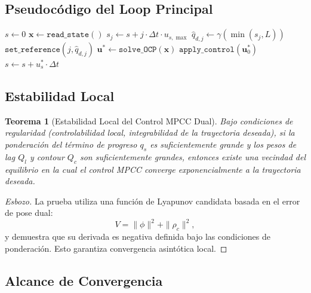 \documentclass[11pt,a4paper]{article}
\newtheorem{theorem}{Teorema}[section]
\begin{document}
\subsection{Pseudocódigo del Loop Principal}

\begin{algorithm}[H]
\caption{MPCC Loop Principal}
\begin{algorithmic}[1]
\State $s \gets 0$ 
    \State $\mathbf{x} \gets \texttt{read\_state}()$
        \State $s_j \gets s + j \cdot \Delta t \cdot u_{s,\max}$
        \State $\hat{q}_{d,j} \gets \gamma(\min(s_j, L))$ 
        \State $\texttt{set\_reference}(j, \hat{q}_{d,j})$
    \EndFor
    \State $\mathbf{u}^* \gets \texttt{solve\_OCP}(\mathbf{x})$
    \State $\texttt{apply\_control}(\mathbf{u}^*_0)$
    \State $s \gets s + u_s^* \cdot \Delta t$ 
\EndWhile
\end{algorithmic}
\end{algorithm}

\subsection{Estabilidad Local}

\begin{theorem}[Estabilidad Local del Control MPCC Dual]
Bajo condiciones de regularidad (controlabilidad local, integrabilidad de la trayectoria deseada), si la ponderación del término de progreso $q_s$ es suficientemente grande y los pesos de lag $Q_l$ y contour $Q_c$ son suficientemente grandes, entonces existe una vecindad del equilibrio en la cual el control MPCC converge exponencialmente a la trayectoria deseada.
\end{theorem}

\begin{proof}[Esbozo]
La prueba utiliza una función de Lyapunov candidata basada en el error de pose dual:
\begin{equation}
    V = \|\phi\|^2 + \|\rho_c\|^2,
\end{equation}
y demuestra que su derivada es negativa definida bajo las condiciones de ponderación. Esto garantiza convergencia asintótica local.
\end{proof}

\subsection{Alcance de Convergencia}
\end{document}
